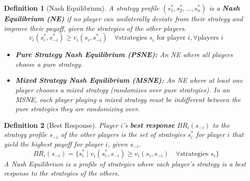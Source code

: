 \documentclass{article}
\newtheorem{definition}{Definition}
\begin{document}
\begin{definition}[Nash Equilibrium]
A strategy profile $(s_1^*, s_2^*, ..., s_n^*)$ is a \textbf{Nash Equilibrium (NE)} if no player can unilaterally deviate from their strategy and improve their payoff, given the strategies of the other players.
\[v_i(s_i^*, s_{-i}^*) \ge v_i(s_i, s_{-i}^*) \quad \forall \text{strategies } s_i \text{ for player } i, \forall \text{players } i\]
\begin{itemize}
    \item \textbf{Pure Strategy Nash Equilibrium (PSNE):} An NE where all players choose a pure strategy.
    \item \textbf{Mixed Strategy Nash Equilibrium (MSNE):} An NE where at least one player chooses a mixed strategy (randomizes over pure strategies). In an MSNE, each player playing a mixed strategy must be indifferent between the pure strategies they are randomizing over.
\end{itemize}
\end{definition}

\begin{definition}[Best Response]
Player $i$'s \textbf{best response} $BR_i(s_{-i})$ to the strategy profile $s_{-i}$ of the other players is the set of strategies $s_i^*$ for player $i$ that yield the highest payoff for player $i$, given $s_{-i}$.
\[BR_i(s_{-i}) = \{ s_i^* \mid v_i(s_i^*, s_{-i}) \ge v_i(s_i, s_{-i}) \quad \forall \text{strategies } s_i \}\]
A Nash Equilibrium is a profile of strategies where each player's strategy is a best response to the strategies of the others.
\end{definition}
\end{document}
